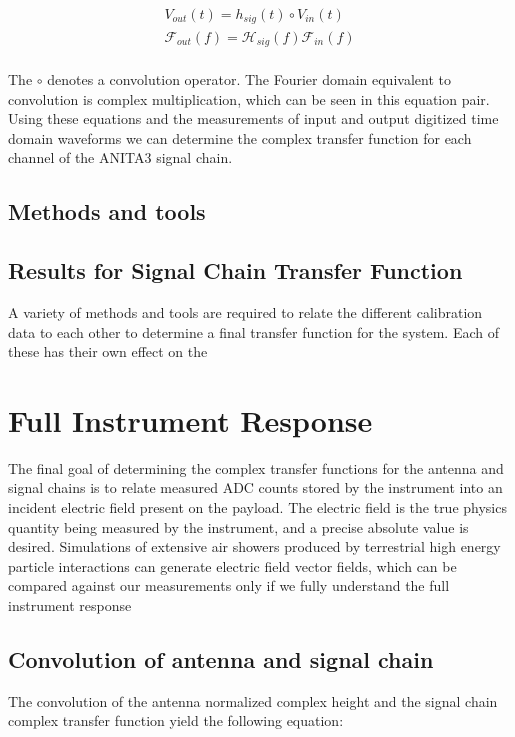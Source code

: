 \begin{equation}
\begin{split}
V_{out}(t) = h_{sig}(t) \circ V_{in}(t) \\
\mathcal{F}_{out}(f) = \mathcal{H}_{sig}(f) \mathcal{F}_{in}(f) \\
\label{eqn:ComplexTF}
\end{split}
\end{equation}

The $\circ$ denotes a convolution operator.  The Fourier domain equivalent to convolution is complex multiplication, which can be seen in this equation pair.  Using these equations and the measurements of input and output digitized time domain waveforms we can determine the complex transfer function for each channel of the ANITA3 signal chain.

		

	\subsection{Methods and tools}
	
	
	\subsection{Results for Signal Chain Transfer Function}
		
	
	
	A variety of methods and tools are required to relate the different calibration data to each other to determine a final transfer function for the system.  Each of these has their own effect on the 


\section{Full Instrument Response}

	The final goal of determining the complex transfer functions for the antenna and signal chains is to relate measured ADC counts stored by the instrument into an incident electric field present on the payload.  The electric field is the true physics quantity being measured by the instrument, and a precise absolute value is desired.  Simulations of extensive air showers produced by terrestrial high energy particle interactions can generate electric field vector fields, which can be compared against our measurements only if we fully understand the full instrument response
	
	\subsection{Convolution of antenna and signal chain}
		The convolution of the antenna normalized complex height and the signal chain complex transfer function yield the following equation:
		
